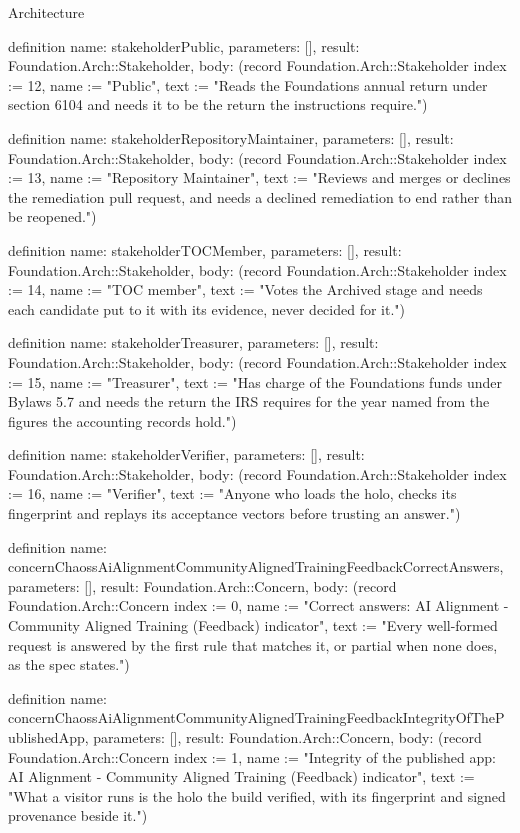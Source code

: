 \begin{lexlean}{Architecture}
\begin{semanticmodule}
definition{
  name: stakeholderPublic,
  parameters: [],
  result: Foundation.Arch::Stakeholder,
  body: (record Foundation.Arch::Stakeholder {index := 12, name := "Public", text := "Reads the Foundations annual return under section 6104 and needs it to be the return the instructions require."})
}

definition{
  name: stakeholderRepositoryMaintainer,
  parameters: [],
  result: Foundation.Arch::Stakeholder,
  body: (record Foundation.Arch::Stakeholder {index := 13, name := "Repository Maintainer", text := "Reviews and merges or declines the remediation pull request, and needs a declined remediation to end rather than be reopened."})
}

definition{
  name: stakeholderTOCMember,
  parameters: [],
  result: Foundation.Arch::Stakeholder,
  body: (record Foundation.Arch::Stakeholder {index := 14, name := "TOC member", text := "Votes the Archived stage and needs each candidate put to it with its evidence, never decided for it."})
}

definition{
  name: stakeholderTreasurer,
  parameters: [],
  result: Foundation.Arch::Stakeholder,
  body: (record Foundation.Arch::Stakeholder {index := 15, name := "Treasurer", text := "Has charge of the Foundations funds under Bylaws 5.7 and needs the return the IRS requires for the year named from the figures the accounting records hold."})
}

definition{
  name: stakeholderVerifier,
  parameters: [],
  result: Foundation.Arch::Stakeholder,
  body: (record Foundation.Arch::Stakeholder {index := 16, name := "Verifier", text := "Anyone who loads the holo, checks its fingerprint and replays its acceptance vectors before trusting an answer."})
}

definition{
  name: concernChaossAiAlignmentCommunityAlignedTrainingFeedbackCorrectAnswers,
  parameters: [],
  result: Foundation.Arch::Concern,
  body: (record Foundation.Arch::Concern {index := 0, name := "Correct answers: AI Alignment - Community Aligned Training (Feedback) indicator", text := "Every well-formed request is answered by the first rule that matches it, or partial when none does, as the spec states."})
}

definition{
  name: concernChaossAiAlignmentCommunityAlignedTrainingFeedbackIntegrityOfThePublishedApp,
  parameters: [],
  result: Foundation.Arch::Concern,
  body: (record Foundation.Arch::Concern {index := 1, name := "Integrity of the published app: AI Alignment - Community Aligned Training (Feedback) indicator", text := "What a visitor runs is the holo the build verified, with its fingerprint and signed provenance beside it."})
}


\end{semanticmodule}
\end{lexlean}
